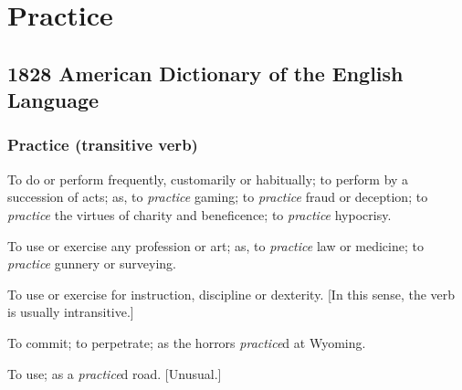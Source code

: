 \section{Practice}
	\label{PRACTICE}
	

\subsection{1828 American Dictionary of the English Language} %
	\label{PRACTICE-1828}
	
	\subsubsection{Practice (transitive verb)}

	\begin{compactitem}
		\item[1] To do or perform frequently, customarily or habitually; to perform by a succession of acts; as, to \textit{practice} gaming; to \textit{practice} fraud or deception; to \textit{practice} the virtues of charity and beneficence; to \textit{practice} hypocrisy.
		\item[2] To use or exercise any profession or art; as, to \textit{practice} law or medicine; to \textit{practice} gunnery or surveying.
		\item[3] To use or exercise for instruction, discipline or dexterity. [In this sense, the verb is usually intransitive.]
		\item[4] To commit; to perpetrate; as the horrors \textit{practice}d at Wyoming.
		\item[5] To use; as a \textit{practice}d road. [Unusual.]
	\end{compactitem}


